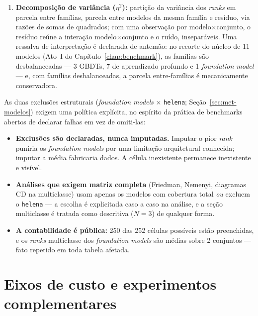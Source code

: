 \begin{enumerate}
    declarada, não uma constante da área --- por isso a análise é
    repetida com sensibilidade em
    $\{0{,}005;\, 0{,}01;\, 0{,}02\}$, reportada integralmente no
    Capítulo~\ref{chap:benchmark}.
  \item \textbf{Decomposição de variância ($\eta^2$):} partição da
    variância dos \emph{ranks} em parcela entre famílias, parcela entre
    modelos da mesma família e resíduo, via razões de somas de
    quadrados; com uma observação por modelo$\times$conjunto, o
    resíduo reúne a interação modelo$\times$conjunto e o ruído,
    inseparáveis. Uma ressalva de interpretação é
    declarada de antemão: no recorte do núcleo de 11 modelos (Ato~I do
    Capítulo~\ref{chap:benchmark}), as famílias são desbalanceadas --- 3
    GBDTs, 7 de aprendizado profundo e 1 \emph{foundation model} --- e,
    com famílias desbalanceadas, a parcela entre-famílias é mecanicamente
    conservadora.
\end{enumerate}

As duas exclusões estruturais
(\emph{foundation models} $\times$ \texttt{helena};
Seção~\ref{sec:met-modelos}) exigem uma política explícita, no espírito da
prática de benchmarks abertos de declarar falhas em vez de omiti-las:

\begin{itemize}
  \item \textbf{Exclusões são declaradas, nunca imputadas.} Imputar o pior
    \emph{rank} puniria os \emph{foundation models} por uma limitação
    arquitetural conhecida; imputar a média fabricaria dados. A célula
    inexistente permanece inexistente e visível.
  \item \textbf{Análises que exigem matriz completa} (Friedman, Nemenyi,
    diagramas CD na multiclasse) usam apenas os modelos com cobertura total
    \emph{ou} excluem o \texttt{helena} --- a escolha é explicitada caso a
    caso na análise, e a seção multiclasse é tratada como descritiva
    ($N=3$) de qualquer forma.
  \item \textbf{A contabilidade é pública:} 250 das 252 células possíveis
    estão preenchidas, e os \emph{ranks} multiclasse dos \emph{foundation
    models} são médias sobre 2 conjuntos --- fato repetido em toda tabela
    afetada.
\end{itemize}

\section{Eixos de custo e experimentos complementares}
\label{sec:met-custo}

